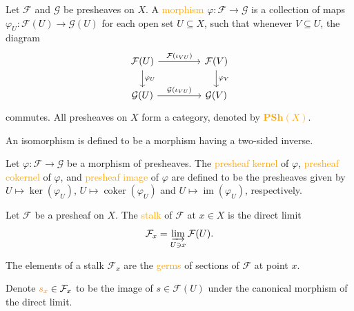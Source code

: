 \begin{definition}
	Let $\mathcal{F}$ and $\mathcal{G}$ be presheaves on $X$. A \textcolor{orange}{morphism} $\varphi:\mathcal{F}\rightarrow\mathcal{G}$ is a collection of maps $\varphi_U:\mathcal{F}(U)\rightarrow\mathcal{G}(U)$ for each open set $U \subseteq X$, such that whenever $V\subseteq U$, the diagram
	\begin{equation*}
		\begin{tikzcd}
			\mathcal{F}(U)\arrow[r,"\mathcal{F}\left(\iota_{VU}\right)"]\arrow[d,"\varphi_U"]&[2em]\mathcal{F}(V)\arrow[d,"\varphi_V"]\\
			\mathcal{G}(U)\arrow[r,"\mathcal{G}\left(\iota_{VU}\right)"]&\mathcal{G}(V)
		\end{tikzcd}
	\end{equation*}
	commutes. All presheaves on $X$ form a category, denoted by \textcolor{orange}{$\mathbf{PSh}(X)$}.
	
	An isomorphism is defined to be a morphism having a two-sided inverse.
\end{definition}

\begin{definition}
	Let $\varphi:\mathcal{F}\rightarrow\mathcal{G}$ be a morphism of presheaves. The \textcolor{orange}{presheaf kernel} of $\varphi$, \textcolor{orange}{presheaf cokernel} of $\varphi$, and \textcolor{orange}{presheaf image} of $\varphi$ are defined to be the presheaves given by $U\mapsto\ker(\varphi_U)$, $U\mapsto\operatorname{coker}(\varphi_U)$ and $U\mapsto\operatorname{im}(\varphi_U)$, respectively.
\end{definition}

\begin{definition}
	Let $\mathcal{F}$ be a presheaf on $X$. The \textcolor{orange}{stalk} of $\mathcal{F}$ at $x \in X$ is the direct limit
	\begin{equation*}
		\mathcal{F}_x=\varinjlim_{U\ni x}\mathcal{F}(U).
	\end{equation*}
	
	The elements of a stalk $\mathcal{F}_x$ are the \textcolor{orange}{germs} of sections of $\mathcal{F}$ at point $x$.
	
	Denote $\mathcolor{orange}{s_x}\in\mathcal{F}_x$ to be the image of $s\in\mathcal{F}(U)$ under the canonical morphism of the direct limit.
\end{definition}

